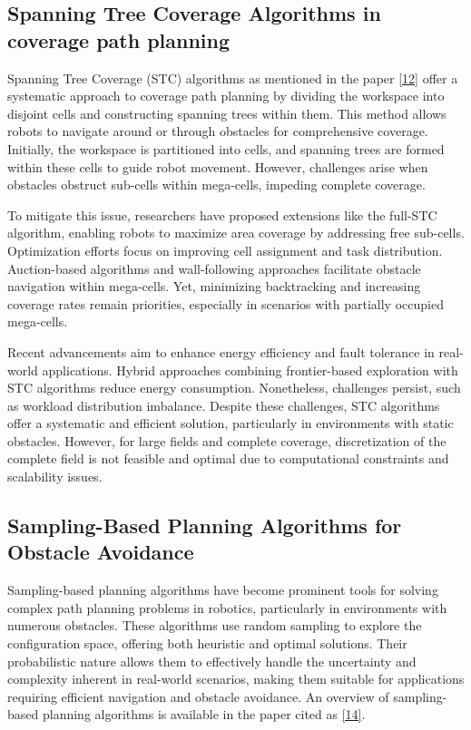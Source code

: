 \subsection{Spanning Tree Coverage Algorithms in coverage path planning}

Spanning Tree Coverage (STC) algorithms as mentioned in the paper \hyperlink{cite.spanning_tree}{[12]} offer a systematic approach to coverage path planning by dividing the workspace into disjoint cells and constructing spanning trees within them. This method allows robots to navigate around or through obstacles for comprehensive coverage. Initially, the workspace is partitioned into cells, and spanning trees are formed within these cells to guide robot movement. However, challenges arise when obstacles obstruct sub-cells within mega-cells, impeding complete coverage.

\vspace{3mm}

To mitigate this issue, researchers have proposed extensions like the full-STC algorithm, enabling robots to maximize area coverage by addressing free sub-cells. Optimization efforts focus on improving cell assignment and task distribution. Auction-based algorithms and wall-following approaches facilitate obstacle navigation within mega-cells. Yet, minimizing backtracking and increasing coverage rates remain priorities, especially in scenarios with partially occupied mega-cells.

\vspace{3mm}

Recent advancements aim to enhance energy efficiency and fault tolerance in real-world applications. Hybrid approaches combining frontier-based exploration with STC algorithms reduce energy consumption. Nonetheless, challenges persist, such as workload distribution imbalance. Despite these challenges, STC algorithms offer a systematic and efficient solution, particularly in environments with static obstacles. However, for large fields and complete coverage, discretization of the complete field is not feasible and optimal due to computational constraints and scalability issues.





\subsection{Sampling-Based Planning Algorithms for Obstacle Avoidance}

Sampling-based planning algorithms have become prominent tools for solving complex path planning problems in robotics, particularly in environments with numerous obstacles. These algorithms use random sampling to explore the configuration space, offering both heuristic and optimal solutions. Their probabilistic nature allows them to effectively handle the uncertainty and complexity inherent in real-world scenarios, making them suitable for applications requiring efficient navigation and obstacle avoidance. An overview of sampling-based planning algorithms is available in the paper cited as \hyperlink{cite.sampling_based_more_related}{[14]}.

